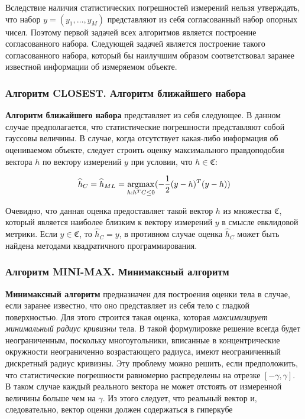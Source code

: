 \documentclass[a4paper, 12pt, titlepage]{article}
\theoremstyle{definition}
\theoremstyle{plain}
\theoremstyle{plain}
\begin{document}
Вследствие наличия статистических погрешностей измерений нельзя утверждать, что
набор $y = (y_{1}, \ldots, y_{M})$ представляют из себя согласованный набор
опорных чисел. Поэтому первой задачей всех алгоритмов является построение
согласованного набора. Следующей задачей является построение такого
согласованного набора, который бы наилучшим образом соответствовал заранее
известной информации об измеряемом объекте.

\subsubsection{Алгоритм CLOSEST. Алгоритм ближайшего набора}
\label{sec:history/PrinceW90/algo-CLOSEST}

\textbf{Алгоритм ближайшего набора} представляет из себя следующее. В данном
случае предполагается, что статистические погрешности представляют собой
гауссовы величины. В случае, когда отсутствует какая-либо информация об
оцениваемом объекте, следует строить оценку максимального правдоподобия вектора
$h$ по вектору измерений $y$ при условии, что $h \in \mathfrak{C}$:

\begin{equation}
\widehat{h}_{C} = \widehat{h}_{ML} =
\operatornamewithlimits{argmax}_{h: h^{T} C \leq 0}
( - \frac{1}{2} (y - h)^{T} (y - h))
\end{equation}

Очевидно, что данная оценка предоставляет такой вектор $h$ из множества
$\mathfrak{C}$, который является наиболее близким к вектору измерений $y$ в
смысле евклидовой метрики. Если $y \in \mathfrak{C}$, то $\widehat{h}_{C} = y$,
в противном случае оценка $\widehat{h}_{C}$ может быть найдена методами
квадратичного программирования.

\subsubsection{Алгоритм MINI-MAX. Минимаксный алгоритм}
\label{sec:history/PrinceW90/algo-MINI-MAX}


\textbf{Минимаксный алгоритм} предназначен для построения
оценки тела в случае, если заранее известно, что оно представляет из себя тело
с гладкой поверхностью. Для этого строится такая оценка, которая
\textit{максимизирует минимальный радиус кривизны} тела. В такой формулировке
решение всегда будет неограниченным, поскольку многоугольники, вписанные в
концентрические окружности неограниченно возрастающего радиуса, имеют
неограниченный дискретный радиус кривизны. Эту проблему можно решить, если
предположить, что статистические погрешности равномерно распределены на отрезке
$[ - \gamma, \gamma]$. В таком случае каждый реального вектора не может
отстоять от измеренной величины больше чем на $\gamma$. Из этого следует, что
реальный вектор и, следовательно, вектор оценки должен содержаться в гиперкубе
\end{document}
